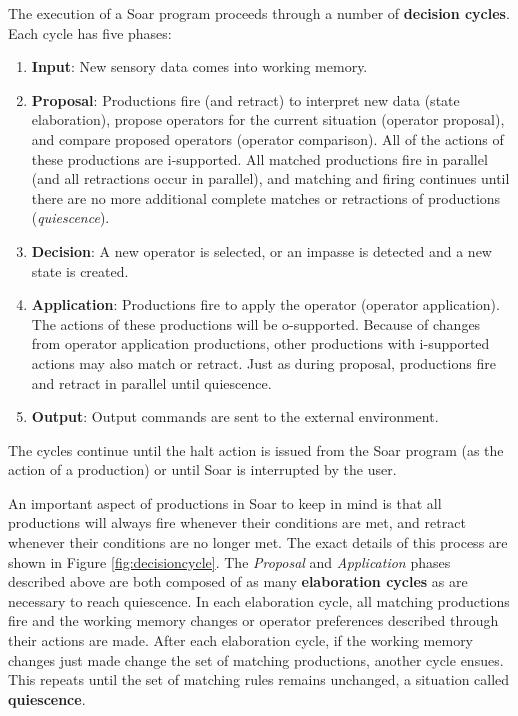 The execution of a Soar program proceeds through a number of \textbf{decision cycles}. Each cycle has five phases:

\begin{enumerate}
	\item \textbf{Input}:
		New sensory data comes into working memory.
	\item \textbf{Proposal}:
		Productions fire (and retract) to interpret new data (state elaboration), propose operators for the current situation (operator proposal), and compare proposed operators (operator comparison).  All of the actions of these productions are i-supported.  All matched productions fire in parallel (and all retractions occur in parallel), and matching and firing continues until there are no more additional complete matches or retractions of productions (\emph{quiescence}).
	\item \textbf{Decision}:
		A new operator is selected, or an impasse is detected and a new state is created.
	\item \textbf{Application}:
		Productions fire to apply the operator (operator application).  The actions of these productions will be o-supported. Because of changes from operator application productions, other productions with i-supported actions may also match or retract. Just as during proposal, productions fire and retract in parallel until quiescence.
	\item \textbf{Output}:
		Output commands are sent to the external environment.
\end{enumerate}

The cycles continue until the halt action is issued from the Soar program (as the action of a production) or until Soar is interrupted by the user.

An important aspect of productions in Soar to keep in mind is that all productions will always fire whenever their conditions are met, and retract whenever their conditions are no longer met. The exact details of this process are shown in Figure \ref{fig:decisioncycle}. The \emph{Proposal} and \emph{Application} phases described above are both composed of as many \textbf{elaboration cycles} as are necessary to reach quiescence. In each elaboration cycle, all matching productions fire and the working memory changes or operator preferences described through their actions are made. After each elaboration cycle, if the working memory changes just made change the set of matching productions, another cycle ensues. This repeats until the set of matching rules remains unchanged, a situation called \textbf{quiescence}.


